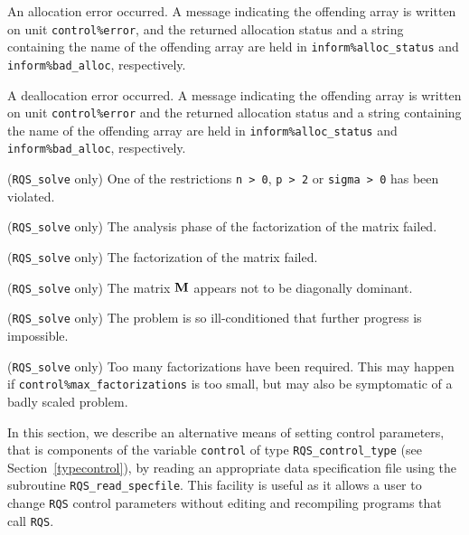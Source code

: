 \documentclass{galahad}
\newcommand{\packagename}{RQS}
\begin{document}
\begin{description}
 An allocation error occurred. A message indicating
the offending
array is written on unit {\tt control\%error}, and the returned allocation
status and a string containing the name of the offending array
are held in {\tt inform\%alloc\_\-status}
and {\tt inform\%bad\_alloc}, respectively.

 A deallocation error occurred.
A message indicating the offending
array is written on unit {\tt control\%error} and the returned allocation
status and a string containing the name of the offending array
are held in {\tt inform\%alloc\_\-status}
and {\tt inform\%bad\_alloc}, respectively.

 ({\tt \packagename\_solve} only)
One of the restrictions
{\tt n > 0},
{\tt p > 2}
or
{\tt sigma > 0}
has been violated.

 ({\tt \packagename\_solve} only)
The analysis phase of the factorization of the matrix  failed.

 ({\tt \packagename\_solve} only)
The factorization of the matrix  failed.

 ({\tt \packagename\_solve} only)
The matrix ${\mathbf{M}}$ appears not to be diagonally dominant.

 ({\tt \packagename\_solve} only)
The problem is so ill-conditioned that further progress is impossible.

 ({\tt \packagename\_solve} only)
Too many factorizations have been required.  This may happen if
    {\tt control\%max\_factorizations} is too small,
    but may also be symptomatic of a badly scaled problem.

\end{description}


\galfeatures
\noindent In this section, we describe an alternative means of setting
control parameters, that is components of the variable {\tt control} of type
{\tt \packagename\_control\_type}
(see Section~\ref{typecontrol}),
by reading an appropriate data specification file using the
subroutine {\tt \packagename\_read\_specfile}. This facility
is useful as it allows a user to change  {\tt \packagename} control parameters
without editing and recompiling programs that call {\tt \packagename}.
\end{document}
